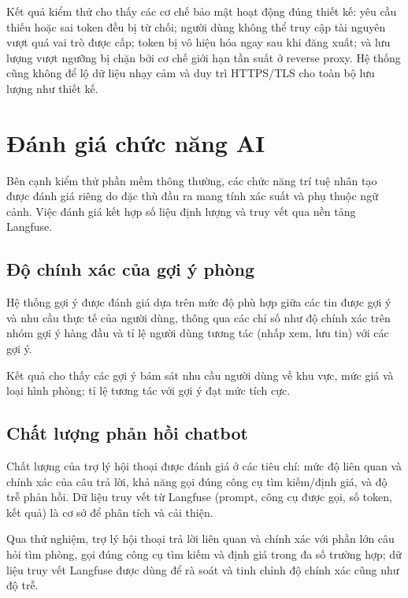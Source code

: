 Kết quả kiểm thử cho thấy các cơ chế bảo mật hoạt động đúng thiết kế: yêu cầu thiếu hoặc sai token đều bị từ chối; người dùng không thể truy cập tài nguyên vượt quá vai trò được cấp; token bị vô hiệu hóa ngay sau khi đăng xuất; và lưu lượng vượt ngưỡng bị chặn bởi cơ chế giới hạn tần suất ở reverse proxy. Hệ thống cũng không để lộ dữ liệu nhạy cảm và duy trì HTTPS/TLS cho toàn bộ lưu lượng như thiết kế.

\section{Đánh giá chức năng AI}

Bên cạnh kiểm thử phần mềm thông thường, các chức năng trí tuệ nhân tạo được đánh giá riêng do đặc thù đầu ra mang tính xác suất và phụ thuộc ngữ cảnh. Việc đánh giá kết hợp số liệu định lượng và truy vết qua nền tảng Langfuse.

\subsection{Độ chính xác của gợi ý phòng}

Hệ thống gợi ý được đánh giá dựa trên mức độ phù hợp giữa các tin được gợi ý và nhu cầu thực tế của người dùng, thông qua các chỉ số như độ chính xác trên nhóm gợi ý hàng đầu và tỉ lệ người dùng tương tác (nhấp xem, lưu tin) với các gợi ý.

Kết quả cho thấy các gợi ý bám sát nhu cầu người dùng về khu vực, mức giá và loại hình phòng; tỉ lệ tương tác với gợi ý đạt mức tích cực.

\subsection{Chất lượng phản hồi chatbot}

Chất lượng của trợ lý hội thoại được đánh giá ở các tiêu chí: mức độ liên quan và chính xác của câu trả lời, khả năng gọi đúng công cụ tìm kiếm/định giá, và độ trễ phản hồi. Dữ liệu truy vết từ Langfuse (prompt, công cụ được gọi, số token, kết quả) là cơ sở để phân tích và cải thiện.

Qua thử nghiệm, trợ lý hội thoại trả lời liên quan và chính xác với phần lớn câu hỏi tìm phòng, gọi đúng công cụ tìm kiếm và định giá trong đa số trường hợp; dữ liệu truy vết Langfuse được dùng để rà soát và tinh chỉnh độ chính xác cũng như độ trễ.

